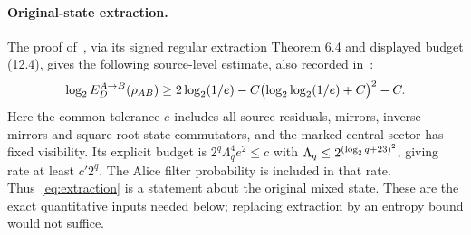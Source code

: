 \paragraph{Original-state extraction.}
The proof of~\cite[Theorem 12.4]{Precision}, via its signed regular extraction Theorem 6.4 and displayed budget (12.4), gives the following source-level estimate, also recorded in~\cite[Section P1]{UP}:
\begin{equation}\label{eq:extraction}
 \log_2E_D^{A\to B}(\rho_{AB})\ge 2\log_2(1/e)
 -C\bigl(\log_2\log_2(1/e)+C\bigr)^2-C.
\end{equation}
Here the common tolerance $e$ includes all source residuals, mirrors, inverse mirrors and square-root-state commutators, and the marked central sector has fixed visibility. Its explicit budget is $2^q\Lambda_q^4e^2\le c$ with $\Lambda_q\le2^{(\log_2 q+23)^2}$, giving rate at least $c'2^q$. The Alice filter probability is included in that rate. Thus~\eqref{eq:extraction} is a statement about the original mixed state. These are the exact quantitative inputs needed below; replacing extraction by an entropy bound would not suffice.
